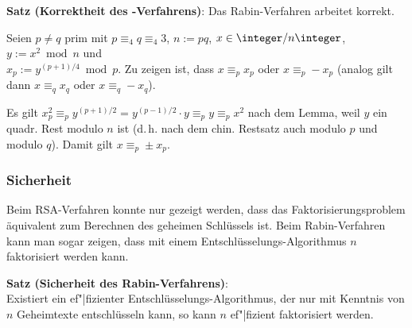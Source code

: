 \linie

\textbf{Satz (Korrektheit des -Verfahrens)}:
Das Rabin-Verfahren arbeitet korrekt.

\begin{Beweis}
    Seien $p \not= q$ prim mit $p \equiv_4 q \equiv_4 3$,
    $n := pq$,
    $x \in \ZnZ$,
    $y := x^2 \bmod n$ und\\
    $x_p := y^{(p+1)/4} \bmod p$.
    Zu zeigen ist, dass $x \equiv_p x_p$ oder $x \equiv_p -x_p$
    (analog gilt dann $x \equiv_q x_q$ oder $x \equiv_q -x_q$).
    
    Es gilt $x_p^2 \equiv_p y^{(p+1)/2} = y^{(p-1)/2} \cdot y \equiv_p y \equiv_p x^2$
    nach dem Lemma, weil $y$ ein quadr. Rest modulo $n$ ist
    (d.\,h. nach dem chin. Restsatz auch modulo $p$ und modulo $q$).
    Damit gilt $x \equiv_p \pm x_p$.
\end{Beweis}

\subsubsection{%
    Sicherheit%
}

Beim RSA-Verfahren konnte nur gezeigt werden, dass das Faktorisierungsproblem äquivalent zum
Berechnen des geheimen Schlüssels ist.
Beim Rabin-Verfahren kann man sogar zeigen, dass mit einem Entschlüsselungs-Algorithmus
$n$ faktorisiert werden kann.

\textbf{Satz (Sicherheit des Rabin-Verfahrens)}:\\
Existiert ein ef"|fizienter Entschlüsselungs-Algorithmus, der nur mit Kenntnis von $n$
Geheimtexte entschlüsseln kann, so kann $n$ ef"|fizient faktorisiert werden.

